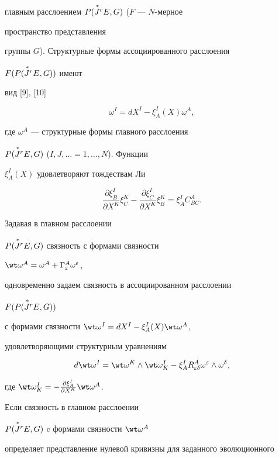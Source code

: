 главным расслоением $P(\overset{\,*}{J}{}^r E,G)$ ($F$ --- $N$-мерное 


пространство представления 


группы $G$). Структурные формы ассоциированного расслоения 


$F(P(\overset{\,*}{J}{}^r E,G))$ имеют 


вид [9], [10]


$$ 


\omega^I=d X^I-\xi^I_A(X)\omega^A, 


$$ 


где $\omega^A$ --- структурные формы главного расслоения 


$P(\overset{\,*}{J}{}^r E,G)$ ($I,J,\dotsc=1,\dotsc,N$). Функции 


$\xi^I_A(X)$ удовлетворяют тождествам Ли 


$$ 


\frac{\partial\xi^I_B}{\partial X^K}\xi^K_C- 


\frac{\partial\xi^I_C}{\partial X^K}\xi^K_B=\xi^I_A C^A_{B C}. 


$$ 


 


Задавая в главном расслоении 


$P(\overset{\,*}{J}{}^r E,G)$ связность с формами связности 


$\wt\omega^A=\omega^A+\Gamma^A_\varepsilon\omega^\varepsilon$, 


одновременно задаем связность в ассоциированном расслоении 


$F(P(\overset{\,*}{J}{}^r E,G))$ 


с формами связности $\wt\omega^I=d X^I-\xi^I_A(X)\wt\omega^A$, 


удовлетворяющими структурным уравнениям 


$$ 


d\wt\omega^I=\wt\omega^K\wedge\wt\omega^I_K- 


\xi^I_A R^A_{\varepsilon\delta}\omega^\varepsilon


\wedge\omega^\delta, 


$$ 


где $\wt\omega^I_K=-\frac{\partial\xi^I_A}{\partial X^K}\wt\omega^A$. 


 


Если связность в главном расслоении 


$P(\overset{\,*}{J}{}^r E,G)$ c формами связности $\wt\omega^A$ 


определяет представление нулевой кривизны для заданного эволюционного 


